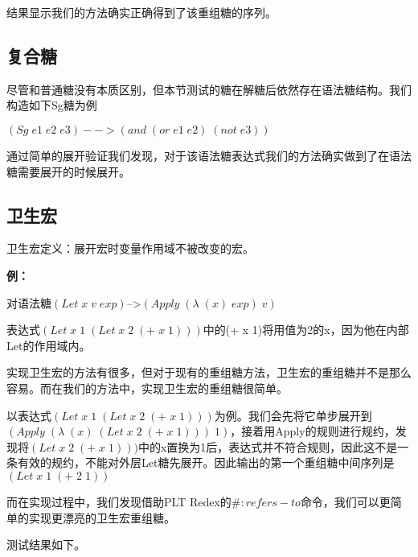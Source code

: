 结果显示我们的方法确实正确得到了该重组糖的序列。

\subsection{复合糖}

尽管和普通糖没有本质区别，但本节测试的糖在解糖后依然存在语法糖结构。我们构造如下Sg糖为例

$(Sg\;e1\;e2\;e3)-->(and\;(or\;e1\;e2)\;(not\;e3))$


通过简单的展开验证我们发现，对于该语法糖表达式我们的方法确实做到了在语法糖需要展开的时候展开。

\label{mark:hygienic}\subsection{卫生宏}

卫生宏定义：展开宏时变量作用域不被改变的宏。

{\bfseries 例：}

对语法糖$(Let\;x\;v\;exp)$-->$(Apply\;(\lambda\;(x)\;exp)\;v)$

表达式$(Let\;x\;1\;(Let\;x\;2\;(+\;x\;1)))$中的(+ x 1)将用值为2的x，因为他在内部Let的作用域内。

实现卫生宏的方法有很多，但对于现有的重组糖方法，卫生宏的重组糖并不是那么容易。而在我们的方法中，实现卫生宏的重组糖很简单。

以表达式$(Let\;x\;1\;(Let\;x\;2\;(+\;x\;1)))$为例。我们会先将它单步展开到
$(Apply\;(\lambda\;(x)\;(Let\;x\;2\;(+\;x\;1)))\;1)$，接着用Apply的规则进行规约，发现将$(Let\;x\;2\;(+\;x\;1)))$中的x置换为1后，表达式并不符合规则，因此这不是一条有效的规约，不能对外层Let糖先展开。因此输出的第一个重组糖中间序列是$(Let\;x\;1\;(+\;2\;1))$

而在实现过程中，我们发现借助PLT Redex的$\#:refers-to$命令，我们可以更简单的实现更漂亮的卫生宏重组糖。

测试结果如下。


